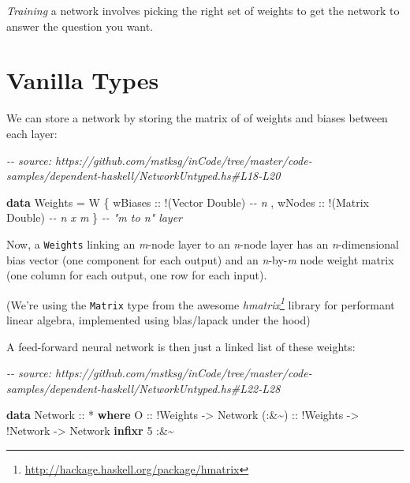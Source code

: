 \documentclass[]{article}
\newenvironment{Shaded}{}{}
\newcommand{\CommentTok}[1]{\textcolor[rgb]{0.38,0.63,0.69}{\textit{#1}}}
\newcommand{\DataTypeTok}[1]{\textcolor[rgb]{0.56,0.13,0.00}{#1}}
\newcommand{\DecValTok}[1]{\textcolor[rgb]{0.25,0.63,0.44}{#1}}
\newcommand{\KeywordTok}[1]{\textcolor[rgb]{0.00,0.44,0.13}{\textbf{#1}}}
\newcommand{\NormalTok}[1]{#1}
\newcommand{\OperatorTok}[1]{\textcolor[rgb]{0.40,0.40,0.40}{#1}}
\newcommand{\OtherTok}[1]{\textcolor[rgb]{0.00,0.44,0.13}{#1}}
\renewcommand{\href}[2]{#2\footnote{\url{#1}}}
\begin{document}
\emph{Training} a network involves picking the right set of weights to get the
network to answer the question you want.

\hypertarget{vanilla-types}{%
\section{Vanilla Types}\label{vanilla-types}}

We can store a network by storing the matrix of of weights and biases between
each layer:

\begin{Shaded}
\begin{Highlighting}[]
\CommentTok{{-}{-} source: https://github.com/mstksg/inCode/tree/master/code{-}samples/dependent{-}haskell/NetworkUntyped.hs\#L18{-}L20}

\KeywordTok{data} \DataTypeTok{Weights} \OtherTok{=} \DataTypeTok{W}\NormalTok{ \{}\OtherTok{ wBiases ::} \OperatorTok{!}\NormalTok{(}\DataTypeTok{Vector} \DataTypeTok{Double}\NormalTok{)  }\CommentTok{{-}{-} n}
\NormalTok{                 ,}\OtherTok{ wNodes  ::} \OperatorTok{!}\NormalTok{(}\DataTypeTok{Matrix} \DataTypeTok{Double}\NormalTok{)  }\CommentTok{{-}{-} n x m}
\NormalTok{                 \}                              }\CommentTok{{-}{-} "m to n" layer}
\end{Highlighting}
\end{Shaded}

Now, a \texttt{Weights} linking an \emph{m}-node layer to an \emph{n}-node layer
has an \emph{n}-dimensional bias vector (one component for each output) and an
\emph{n}-by-\emph{m} node weight matrix (one column for each output, one row for
each input).

(We're using the \texttt{Matrix} type from the awesome
\emph{\href{http://hackage.haskell.org/package/hmatrix}{hmatrix}} library for
performant linear algebra, implemented using blas/lapack under the hood)

A feed-forward neural network is then just a linked list of these weights:

\begin{Shaded}
\begin{Highlighting}[]
\CommentTok{{-}{-} source: https://github.com/mstksg/inCode/tree/master/code{-}samples/dependent{-}haskell/NetworkUntyped.hs\#L22{-}L28}

\KeywordTok{data} \DataTypeTok{Network}\OtherTok{ ::} \OperatorTok{*} \KeywordTok{where}
    \DataTypeTok{O}\OtherTok{     ::} \OperatorTok{!}\DataTypeTok{Weights}
          \OtherTok{{-}>} \DataTypeTok{Network}
\OtherTok{    (:\&\textasciitilde{}) ::} \OperatorTok{!}\DataTypeTok{Weights}
          \OtherTok{{-}>} \OperatorTok{!}\DataTypeTok{Network}
          \OtherTok{{-}>} \DataTypeTok{Network}
\KeywordTok{infixr} \DecValTok{5} \OperatorTok{:\&\textasciitilde{}}
\end{Highlighting}
\end{Shaded}
\end{document}
